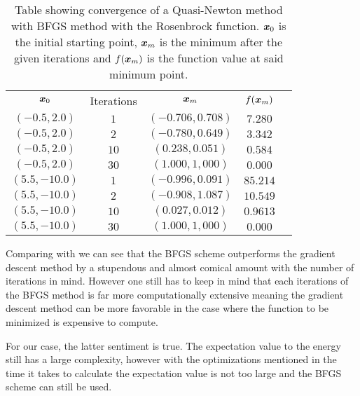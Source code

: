         \begin{table}[H]
            \centering
            \caption{Table showing convergence of a Quasi-Newton method with
            BFGS method with the Rosenbrock function. $\boldsymbol{{x}}_0$ is the
            initial starting point, $\boldsymbol{{x}}_m$ is the minimum after the given
            iterations and $f(\boldsymbol{{x}}_m)$ is the function value at said
            minimum point.}
            \label{tab:rosenbrockconvBFGS}
            \begin{tabular}{ccccc} \hline\hline
                $\boldsymbol{{x}}_0$ & Iterations & $\boldsymbol{{x}}_m$ & $f(\boldsymbol{{x}}_m)$ \\
                $(-0.5,2.0)$ & $1$ & $(-0.706,0.708)$ & $7.280$ \\
                $(-0.5,2.0)$ & $2$ & $(-0.780,0.649)$ & $3.342$ \\
                $(-0.5,2.0)$ & $10$ & $(0.238,0.051)$ & $0.584$ \\
                $(-0.5,2.0)$ & $30$ & $(1.000,1,000)$ & $0.000$ \\
                $(5.5,-10.0)$ & $1$ & $(-0.996,0.091)$ & $85.214$ \\
                $(5.5,-10.0)$ & $2$ & $(-0.908,1.087)$ & $10.549$ \\
                $(5.5,-10.0)$ & $10$ & $(0.027,0.012)$ & $0.9613$ \\
                $(5.5,-10.0)$ & $30$ & $(1.000,1,000)$ & $0.000$ \\ \hline\hline
            \end{tabular}
        \end{table}
    Comparing  with
     we can see that the BFGS
    scheme outperforms the gradient descent method by a stupendous and almost
    comical amount with the number of iterations in mind. However one still has
    to keep in mind that each iterations of the BFGS method is far more
    computationally extensive meaning the gradient descent method can be more
    favorable in the case where the function to be minimized is expensive to
    compute. 

    For our case, the latter sentiment is true. The expectation value to the
    energy still has a large complexity, however with the optimizations
    mentioned in  the time it takes to
    calculate the expectation value is not too large and the BFGS scheme can
    still be used.

